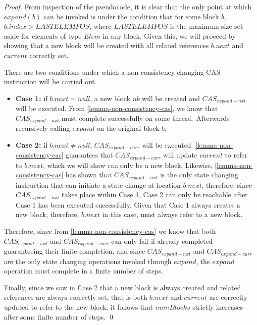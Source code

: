 \documentclass[runningheads,a4paper]{llncs}
\begin{document}
\begin{proof}

From inspection of the pseudocode, it is clear that the only point at which
$expand(b)$ can be invoked is under the condition that for some block $b$,
$b.index > LASTELEMPOS$, where $LASTELEMPOS$ is the maximum size set aside for
elements of type $Elem$ in any block. Given this, we will proceed  by showing
that a new block will be created with all related references  $b.next$ and
$current$ correctly set.

There are two conditions under which a non-consistency changing CAS
instruction will be carried out. 

\begin{itemize}  \item \textbf{Case 1:} if $b.next=null$, a new block $nb$
will be created and $CAS_{expand-nxt}$ will be executed. From
\ref{lemma-non-consistency-cas},  we know that $CAS_{expand-nxt}$
must complete successfully on some thread. Afterwards recursively calling
$expand$ on the original block $b$. \item \textbf{Case 2:} if $b.next \neq
null$, $CAS_{expand-curr}$ will be executed. \ref{lemma-non-consistency-cas}
guarantees that $CAS_{expand-curr}$ will update $current$ to refer to $b.next$,  which we
will show can only be a new block. Likewise, \ref{lemma-non-consistency-cas} 
has shown that  $CAS_{expand-nxt}$ is the only state changing instruction that can
initiate a state change  at location $b.next$, therefore, since $CAS_{expand-nxt}$ takes
place within Case 1, Case 2 can only be reachable after Case 1 has been
executed successfully. Given  that Case 1 always creates a new block,
therefore, $b.next$ in this case, must  always refer to a new block.
\end{itemize}

Therefore, since from \ref{lemma-non-consistency-cas} we know that both
$CAS_{expand-nxt}$ and $CAS_{expand-curr}$ can only fail if already completed
guaranteeing their finite completion, and since $CAS_{expand-nxt}$ and 
$CAS_{expand-curr}$ are the only state changing operations invoked through
$expand$, the $expand$ operation must complete in a finite number of steps.

Finally, since we saw in Case 2 that a new block is always created and related
references are always correctly set, that is both $b.next $ and $current$ are
correctly updated to refer to the new block, it follows that $numBlocks$
strictly increases after some finite number of steps.
\qed
\end{proof}
\end{document}
